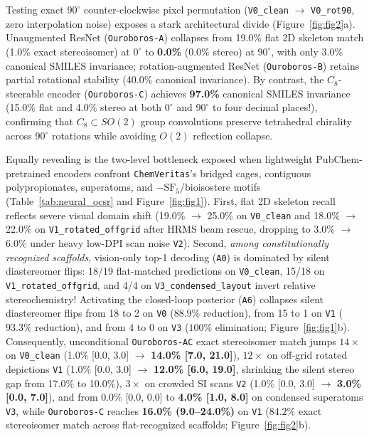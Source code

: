 \documentclass[10pt,twocolumn]{article}
\begin{document}
Testing exact $90^\circ$ counter-clockwise pixel permutation (\texttt{V0\_clean} $\to$ \texttt{V0\_rot90}, zero interpolation noise) exposes a stark architectural divide (Figure~\ref{fig:fig2}a). Unaugmented ResNet (\texttt{Ouroboros-A}) collapses from 19.0\% flat 2D skeleton match (1.0\% exact stereoisomer) at $0^\circ$ to \textbf{0.0\%} (0.0\% stereo) at $90^\circ$, with only 3.0\% canonical SMILES invariance; rotation-augmented ResNet (\texttt{Ouroboros-B}) retains partial rotational stability (40.0\% canonical invariance). By contrast, the $C_8$-steerable encoder (\texttt{Ouroboros-C}) achieves \textbf{97.0\%} canonical SMILES invariance (15.0\% flat and 4.0\% stereo at both $0^\circ$ and $90^\circ$ to four decimal places!), confirming that $C_8 \subset SO(2)$ group convolutions preserve tetrahedral chirality across $90^\circ$ rotations while avoiding $O(2)$ reflection collapse.

Equally revealing is the two-level bottleneck exposed when lightweight PubChem-pretrained encoders confront \texttt{ChemVeritas}'s bridged cages, contiguous polypropionates, superatoms, and $-\text{SF}_5$/bioisostere motifs (Table~\ref{tab:neural_ocsr} and Figure~\ref{fig:fig1}). First, flat 2D skeleton recall reflects severe visual domain shift (19.0\% $\to$ 25.0\% on \texttt{V0\_clean} and 18.0\% $\to$ 22.0\% on \texttt{V1\_rotated\_offgrid} after HRMS beam rescue, dropping to 3.0\% $\to$ 6.0\% under heavy low-DPI scan noise \texttt{V2}). Second, \emph{among constitutionally recognized scaffolds}, vision-only top-1 decoding (\texttt{A0}) is dominated by silent diastereomer flips: 18/19 flat-matched predictions on \texttt{V0\_clean}, 15/18 on \texttt{V1\_rotated\_offgrid}, and 4/4 on \texttt{V3\_condensed\_layout} invert relative stereochemistry! Activating the closed-loop posterior (\texttt{A6}) collapses silent diastereomer flips from 18 to 2 on \texttt{V0} ($88.9\%$ reduction), from 15 to 1 on \texttt{V1} ($93.3\%$ reduction), and from 4 to 0 on \texttt{V3} ($100\%$ elimination; Figure~\ref{fig:fig1}b). Consequently, unconditional \texttt{Ouroboros-AC} exact stereoisomer match jumps $14\times$ on \texttt{V0\_clean} (1.0\% [0.0, 3.0] $\to$ \textbf{14.0\% [7.0, 21.0]}), $12\times$ on off-grid rotated depictions \texttt{V1} (1.0\% [0.0, 3.0] $\to$ \textbf{12.0\% [6.0, 19.0]}, shrinking the silent stereo gap from 17.0\% to 10.0\%), $3\times$ on crowded SI scans \texttt{V2} (1.0\% [0.0, 3.0] $\to$ \textbf{3.0\% [0.0, 7.0]}), and from 0.0\% [0.0, 0.0] to \textbf{4.0\% [1.0, 8.0]} on condensed superatoms \texttt{V3}, while \texttt{Ouroboros-C} reaches \textbf{16.0\% (9.0--24.0\%)} on \texttt{V1} ($84.2\%$ exact stereoisomer match across flat-recognized scaffolds; Figure~\ref{fig:fig2}b).
\end{document}

